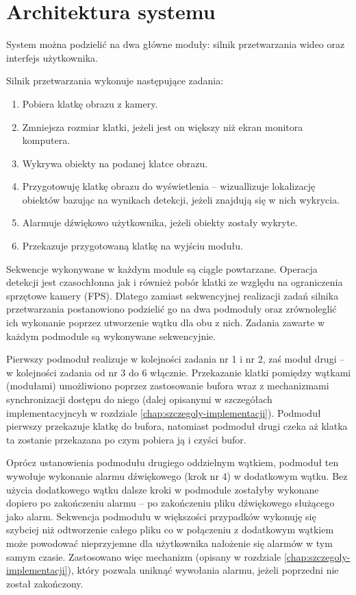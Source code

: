 \section{Architektura systemu}
System można podzielić na dwa główne moduły: silnik przetwarzania wideo oraz interfejs użytkownika. 

Silnik przetwarzania wykonuje następujące zadania:
\begin{enumerate}
    \item Pobiera klatkę obrazu z kamery.
    \item Zmniejsza rozmiar klatki, jeżeli jest on większy niż ekran monitora komputera.
    \item Wykrywa obiekty na podanej klatce obrazu.
    \item Przygotowuję klatkę obrazu do wyświetlenia -- wizuallizuje lokalizację obiektów bazując na wynikach detekcji, jeżeli znajdują się w nich wykrycia.
    \item Alarmuje dźwiękowo użytkownika, jeżeli obiekty zostały wykryte.
    \item Przekazuje przygotowaną klatkę na wyjściu modułu. 
\end{enumerate}

Sekwencje wykonywane w każdym module są ciągle powtarzane.
Operacja detekcji jest czasochłonna jak i również pobór klatki ze względu na ograniczenia sprzętowe kamery (FPS). Dlatego zamiast sekwencyjnej realizacji zadań silnika przetwarzania postanowiono podzielić go na dwa podmoduły oraz zrównoleglić ich wykonanie poprzez utworzenie wątku dla obu z nich. Zadania zawarte w każdym podmodule są wykonywane sekwencyjnie.

Pierwszy podmoduł realizuje w kolejności zadania nr 1 i nr 2, zaś moduł drugi -- w kolejności zadania od nr 3 do 6 włącznie. Przekazanie klatki pomiędzy wątkami (modułami) umożliwiono poprzez zastosowanie bufora wraz z mechanizmami synchronizacji dostępu do niego (dalej opisanymi w szczegółach implementacyjncyh w rozdziale \ref{chap:szczegoly-implementacji}). Podmoduł pierwszy przekazuje klatkę do bufora, natomiast podmoduł drugi czeka aż klatka ta zostanie przekazana po czym pobiera ją i czyści bufor. 

Oprócz ustanowienia podmodułu drugiego oddzielnym wątkiem, podmoduł ten wywołuje wykonanie alarmu dźwiękowego (krok nr 4) w dodatkowym wątku. Bez użycia dodatkowego wątku dalsze kroki w podmodule zostałyby wykonane dopiero po zakończeniu alarmu -- po zakończeniu pliku dźwiękowego służącego jako alarm. Sekwencja podmodułu w większości przypadków wykonuję się szybciej niż odtworzenie całego pliku co w połączeniu z dodatkowym wątkiem może powodować nieprzyjemne dla użytkownika nałożenie się alarmów w tym samym czasie. Zastosowano więc mechanizm (opisany w rozdziale \ref{chap:szczegoly-implementacji}), który pozwala uniknąć wywołania alarmu, jeżeli poprzedni nie został zakończony.  

